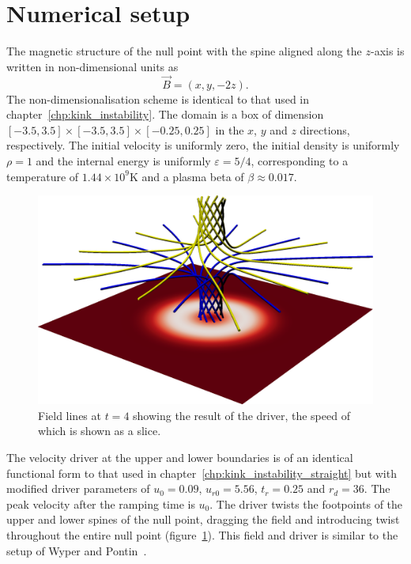 \section{Numerical setup}

\label{sec:khi_numerical_setup}

The magnetic structure of the null point with the spine aligned along the $z$-axis is written in non-dimensional units as
\begin{equation}
  \label{eq:null_point_field}
  \vec{B} = (x, y, -2z).
\end{equation}
The non-dimensionalisation scheme is identical to that used in chapter~\ref{chp:kink_instability}. The domain is a box of dimension $[-3.5, 3.5]\times[-3.5, 3.5]\times [-0.25, 0.25] $ in the $x$, $y$ and $z$ directions, respectively. The initial velocity is uniformly zero, the initial density is uniformly $\rho = 1$ and the internal energy is uniformly $\varepsilon = 5/4$, corresponding to a temperature of $1.44 \times 10^9$K and a plasma beta of $\beta \approx 0.017$.

\begin{figure}[t]
  \centering
      \includegraphics[width=0.5\linewidth]{field_line_plots/cropped/v-4r-4-isotropic_0008_cropped.png}
  \caption{Field lines at $t=4$ showing the result of the driver, the speed of which is shown as a slice.}%
  \label{fig:field_line_plots/v-4r-4-iso-field-8}
\end{figure}

The velocity driver at the upper and lower boundaries is of an identical functional form to that used in chapter~\ref{chp:kink_instability_straight} but with modified driver parameters of $u_0 = 0.09$, $u_{r0} = 5.56$, $t_r = 0.25$ and $r_d = 36$. The peak velocity after the ramping time is $u_0$. The driver twists the footpoints of the upper and lower spines of the null point, dragging the field and introducing twist throughout the entire null point (figure~\ref{fig:field_line_plots/v-4r-4-iso-field-8}). This field and driver is similar to the setup of Wyper and Pontin~\cite{wyperKelvinHelmholtzInstabilityCurrentvortex2013}.

